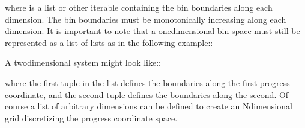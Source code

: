 \documentclass[letterpaper,10pt,english]{sphinxmanual}
\begin{document}
\begin{sphinxVerbatim}[commandchars=\\\{\}]
  
\end{sphinxVerbatim}

where  is a list or other iterable containing the bin boundaries
along each dimension. The bin boundaries must be monotonically increasing along
each dimension. It is important to note that a one\sphinxhyphen{}dimensional bin space must
still be represented as a list of lists as in the following example::

\begin{sphinxVerbatim}[commandchars=\\\{\}]
  \PYG{p}{[}     \PYG{p}{]}
  \PYG{p}{[}\PYG{p}{]}
\end{sphinxVerbatim}

A two\sphinxhyphen{}dimensional system might look like::

\begin{sphinxVerbatim}[commandchars=\\\{\}]
  \PYG{p}{[} \PYG{p}{]}
  
\end{sphinxVerbatim}

where the first tuple in the list defines the boundaries along the first
progress coordinate, and the second tuple defines the boundaries along the
second. Of course a list of arbitrary dimensions can be defined to create an
N\sphinxhyphen{}dimensional grid discretizing the progress coordinate space.
\end{document}
